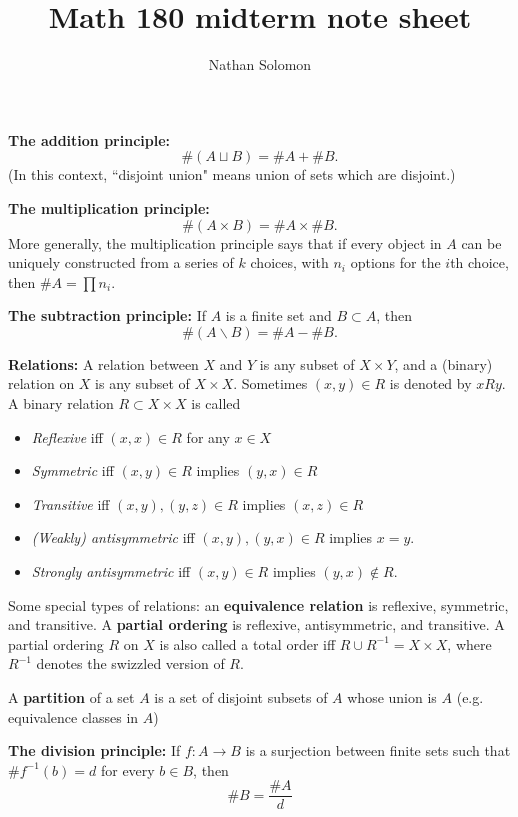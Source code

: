 \documentclass[10pt]{article}
\begin{document}
\title{Math 180 midterm note sheet}
\author{Nathan Solomon}
\maketitle

\textbf{The addition principle:}
\[ \#(A \sqcup B) = \#A + \#B. \]
(In this context, ``disjoint union" means union of sets which are disjoint.)
\par
\textbf{The multiplication principle:}
\[ \#(A \times B) = \#A \times \#B. \]
More generally, the multiplication principle says that if every object in $A$ can be uniquely constructed from a series of $k$ choices, with $n_i$ options for the $i$th choice, then $\#A = \prod n_i$.
\par
\textbf{The subtraction principle:}
If $A$ is a finite set and $B \subset A$, then
\[ \# (A \backslash B) = \# A - \# B. \]
\par
\textbf{Relations:} A relation between $X$ and $Y$ is any subset of $X \times Y$, and a (binary) relation on $X$ is any subset of $X \times X$. Sometimes $(x,y) \in R$ is denoted by $xRy$. A binary relation $R \subset X \times X$ is called
\begin{itemize}[noitemsep]
    \item \textit{Reflexive} iff $(x,x) \in R$ for any $x \in X$
    \item \textit{Symmetric} iff $(x,y) \in R$ implies $(y,x) \in R$
    \item \textit{Transitive} iff $(x,y),(y,z) \in R$ implies $(x,z) \in R$
    \item \textit{(Weakly) antisymmetric} iff $(x,y), (y,x) \in R$ implies $x=y$.
    \item \textit{Strongly antisymmetric} iff $(x,y) \in R$ implies $(y,x) \not\in R$.
\end{itemize}
Some special types of relations: an \textbf{equivalence relation} is reflexive, symmetric, and transitive. A \textbf{partial ordering} is reflexive, antisymmetric, and transitive. A partial ordering $R$ on $X$ is also called a total order iff $R \cup R^{-1} = X \times X$, where $R^{-1}$ denotes the swizzled version of $R$.
\par
A \textbf{partition} of a set $A$ is a set of disjoint subsets of $A$ whose union is $A$ (e.g. equivalence classes in $A$)
\par
\textbf{The division principle:} If $f: A \rightarrow B$ is a surjection between finite sets such that $\# f^{-1}(b) = d$ for every $b \in B$, then
\[ \# B = \frac{\#A}{d} \]
\end{document}
